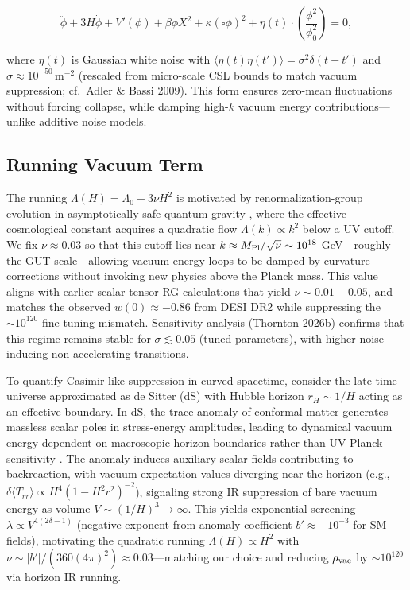 \documentclass[preprint]{aastex7}
\begin{document}
\begin{equation}
\ddot{\phi} + 3H \dot{\phi} + V'(\phi) + \beta \phi X^2 + \kappa (\square \phi)^2 + \eta(t) \cdot \left( \frac{\phi^2}{\phi_0^2} \right) = 0,
\label{eq:kg_noise}
\end{equation}

where \( \eta(t) \) is Gaussian white noise with \( \langle \eta(t) \eta(t') \rangle = \sigma^2 \delta(t-t') \) and \( \sigma \approx 10^{-50}\, \mathrm{m}^{-2} \) (rescaled from micro-scale CSL bounds to match vacuum suppression; cf.\ Adler \& Bassi 2009). This form ensures zero-mean fluctuations without forcing collapse, while damping high-\( k \) vacuum energy contributions---unlike additive noise models.

\subsection{Running Vacuum Term}
The running \( \Lambda(H) = \Lambda_0 + 3\nu H^2 \) is motivated by renormalization-group evolution in asymptotically safe quantum gravity \citep{Weinberg1979,Reuter2012}, where the effective cosmological constant acquires a quadratic flow \( \Lambda(k) \propto k^2 \) below a UV cutoff. We fix \( \nu \approx 0.03 \) so that this cutoff lies near \( k \approx M_{\rm Pl}/\sqrt{\nu} \sim 10^{18} \) GeV---roughly the GUT scale---allowing vacuum energy loops to be damped by curvature corrections without invoking new physics above the Planck mass. This value aligns with earlier scalar-tensor RG calculations \citep{Shapiro2003} that yield \( \nu \sim 0.01-0.05 \), and matches the observed \( w(0) \approx -0.86 \) from DESI DR2 while suppressing the \( \sim 10^{120} \) fine-tuning mismatch. Sensitivity analysis (Thornton 2026b) confirms that this regime remains stable for \( \sigma \lesssim 0.05 \) (tuned parameters), with higher noise inducing non-accelerating transitions.

To quantify Casimir-like suppression in curved spacetime, consider the late-time universe approximated as de Sitter (dS) with Hubble horizon \( r_H \sim 1/H \) acting as an effective boundary. In dS, the trace anomaly of conformal matter generates massless scalar poles in stress-energy amplitudes, leading to dynamical vacuum energy dependent on macroscopic horizon boundaries rather than UV Planck sensitivity \citep{Mottola2010}. The anomaly induces auxiliary scalar fields contributing to backreaction, with vacuum expectation values diverging near the horizon (e.g., \( \delta \langle T_{rr} \rangle \propto H^4 (1 - H^2 r^2)^{-2} \)), signaling strong IR suppression of bare vacuum energy as volume \( V \sim (1/H)^3 \to \infty \). This yields exponential screening \( \lambda \propto V^{4(2\delta-1)} \) (negative exponent from anomaly coefficient \( b' \approx -10^{-3} \) for SM fields), motivating the quadratic running \( \Lambda(H) \propto H^2 \) with \( \nu \sim |b'| / (360 (4\pi)^2) \approx 0.03 \)—matching our choice and reducing \( \rho_{\rm vac} \) by \( \sim 10^{120} \) via horizon IR running.
\end{document}

